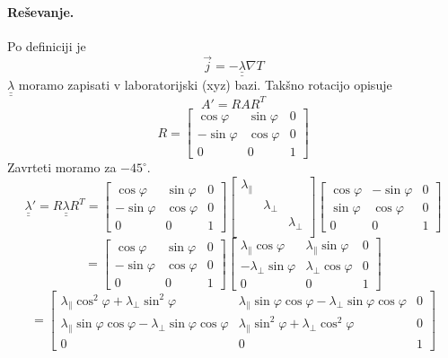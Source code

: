 \documentclass[a4paper]{article}
\newcommand{\vct}[1]{\overrightarrow{#1}}
\newcommand{\duline}[1]{\underline{\underline{#1}}}
\begin{document}
\paragraph{Reševanje.} Po definiciji je $$\vct{j} = -\duline{\lambda} \nabla T$$
$\duline{\lambda}$ moramo zapisati v laboratorijski (xyz) bazi. Takšno rotacijo opisuje
$$A' = RAR^T$$
$$R = \begin{bmatrix}
    \cos\varphi & \sin\varphi & 0 \\
    -\sin\varphi & \cos\varphi & 0 \\
    0 & 0 & 1 
\end{bmatrix}$$
Zavrteti moramo za $-45^\circ$.
$$\duline{\lambda}' = R\duline{\lambda}R^T = \begin{bmatrix}
    \cos\varphi & \sin\varphi & 0 \\
    -\sin\varphi & \cos\varphi & 0 \\
    0 & 0 & 1
\end{bmatrix}\begin{bmatrix}
    \lambda_\parallel && \\
    & \lambda_\perp & \\
    && \lambda_\perp \\
\end{bmatrix}\begin{bmatrix}
    \cos\varphi & -\sin\varphi & 0 \\
    \sin\varphi & \cos\varphi & 0 \\
    0 & 0 & 1 
\end{bmatrix}$$
$$=\begin{bmatrix}
    \cos\varphi & \sin\varphi & 0 \\
    -\sin\varphi & \cos\varphi & 0 \\
    0 & 0 & 1 
\end{bmatrix}\begin{bmatrix}
    \lambda_\parallel\cos\varphi & \lambda_\parallel\sin\varphi & 0 \\
    -\lambda_\perp\sin\varphi & \lambda_\perp\cos\varphi & 0 \\
    0 & 0 & 1
\end{bmatrix}$$
$$ = \begin{bmatrix}
    \lambda_\parallel\cos^2\varphi + \lambda_\perp\sin^2\varphi & \lambda_\parallel\sin\varphi\cos\varphi - \lambda_\perp\sin\varphi\cos\varphi & 0 \\
    \lambda_\parallel\sin\varphi\cos\varphi - \lambda_\perp\sin\varphi\cos\varphi & \lambda_\parallel\sin^2\varphi + \lambda_\perp\cos^2\varphi & 0 \\
    0 & 0 & 1
\end{bmatrix}$$
\end{document}
